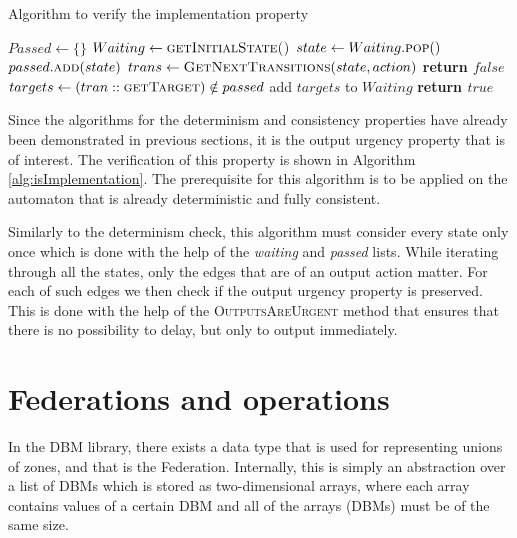 \begin{algorithm}
\caption{Algorithm to verify the implementation property}
\label{alg:isImplementation}
\begin{algorithmic}[1]
\State $Passed \gets \{\}$ 
\State $Waiting \gets \textsc{getInitialState()}$
    \State $state \gets Waiting.\textsc{pop}()$
    \State $passed.\textsc{add}(state)$
        \State $trans \gets \textsc{GetNextTransitions}(state, action)$
            \State \textbf{return $false$}
            \EndIf
        \EndIf
        \State $targets \gets (tran::\textsc{getTarget}) \notin passed $
        \State add $targets$ to $Waiting$
    \EndFor
\EndWhile
\State
\State \textbf{return $true$} 
\EndFunction
\end{algorithmic}
\end{algorithm}

Since the algorithms for the determinism and consistency properties have already been demonstrated in previous sections, it is the output urgency property that is of interest. The verification of this property is shown in Algorithm \ref{alg:isImplementation}. The prerequisite for this algorithm is to be applied on the automaton that is already deterministic and fully consistent.

Similarly to the determinism check, this algorithm must consider every state only once which is done with the help of the \textit{waiting} and \textit{passed} lists. While iterating through all the states, only the edges that are of an output action matter. For each of such edges we then check if the output urgency property is preserved. This is done with the help of the \textsc{OutputsAreUrgent} method that ensures that there is no possibility to delay, but only to output immediately. 


\section{Federations and operations}

In the DBM library, there exists a data type that is used for representing unions of zones, and that is the Federation. Internally, this is simply an abstraction over a list of DBMs which is stored as two-dimensional arrays, where each array contains values of a certain DBM and all of the arrays (DBMs) must be of the same size.


